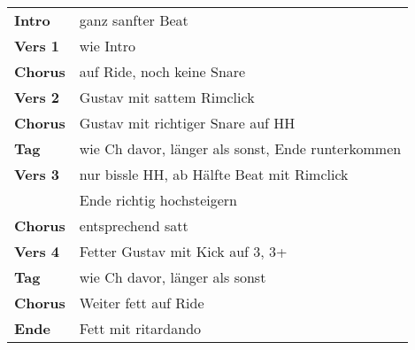
\begin{tabular}{p{1.6cm}l}
	\textbf{Intro}  & ganz sanfter Beat                                 \\
	\textbf{Vers 1} & wie Intro                                         \\
	\textbf{Chorus} & auf Ride, noch keine Snare                        \\
	\textbf{Vers 2} & Gustav mit sattem Rimclick                        \\
	\textbf{Chorus} & Gustav mit richtiger Snare auf HH                 \\
	\textbf{Tag}    & wie Ch davor, länger als sonst, Ende runterkommen \\
	\textbf{Vers 3} & nur bissle HH, ab Hälfte Beat mit Rimclick        \\
	                & Ende richtig hochsteigern                         \\
	\textbf{Chorus} & entsprechend satt                                 \\
	\textbf{Vers 4} & Fetter Gustav mit Kick auf 3, 3+                  \\
	\textbf{Tag}    & wie Ch davor, länger als sonst                    \\
	\textbf{Chorus} & Weiter fett auf Ride                              \\
	\textbf{Ende}   & Fett mit ritardando                               \\
\end{tabular}
